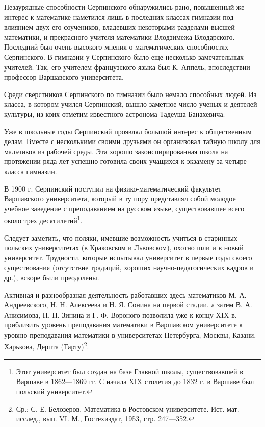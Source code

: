 \documentclass[12pt, a4paper, openany]{book}
\begin{document}
	Незаурядные способности Серпинского обнаружились рано, повышенный же интерес к математике наметился лишь в последних классах гимназии под влиянием двух его соучеников, владевших некоторыми разделами высшей математики, и прекрасного учителя математики Влодзимежа Влодарского. Последний был очень высокого мнения о математических способностях Серпинского. В гимназии у Серпинского было еще несколько замечательных учителей. Так, его учителем французского языка был К. Аппель, впоследствии профессор Варшавского университета.

	Среди сверстников Серпинского по гимназии было немало способных людей. Из класса, в котором учился Серпинский, вышло заметное число ученых и деятелей культуры, из коих отметим известного астронома Тадеуша Банахевича.

	Уже в школьные годы Серпинский проявлял большой интерес к общественным делам. Вместе с несколькими своими друзьями он организовал тайную школу для мальчиков из рабочей среды. Эта хорошо законспирированная школа на протяжении ряда лет успешно готовила своих учащихся к экзамену за четыре класса гимназии.
	
	В 1900 г. Серпинский поступил на физико-математический факультет Варшавского университета, который в ту пору представлял собой молодое учебное заведение с преподаванием на русском языке, существовавшее всего около трех десятилетий\footnote{Этот университет был создан на базе Главной школы, существовавшей в Варшаве в 1862—1869 гг. С начала XIX столетия до 1832 г. в Варшаве был польский университет.}.
	
	Следует заметить, что поляки, имевшие возможность учиться в старинных польских университетах (в Краковском и Львовском), охотно шли и в новый университет. Трудности, которые испытывал университет в первые годы своего существования (отсутствие традиций, хороших научно-педагогических кадров и др.), вскоре были преодолены.
	
	Активная и разнообразная деятельность работавших здесь математиков М. А. Андреевского, Н. Н. Алексеева и Н. Я. Сонина на первой стадии, а затем В. А. Анисимова, Н. Н. Зинина и Г. Ф. Вороного позволила уже к концу XIX в. приблизить уровень преподавания математики в Варшавском университете к уровню преподавания математики в университетах Петербурга, Москвы, Казани, Харькова, Дерпта (Тарту)\footnote{Ср.: С. Е. Белозеров. Математика в Ростовском университете. Ист.-мат. исслед., вып. VI. М., Гостехиздат, 1953, стр. 247—352.}.
	
\end{document}
